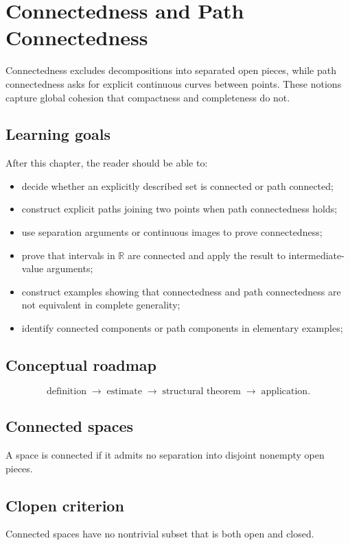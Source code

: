 \chapter{Connectedness and Path Connectedness}
\label{ch:ii07}

Connectedness excludes decompositions into separated open pieces, while path connectedness asks for explicit continuous curves between points. These notions capture global cohesion that compactness and completeness do not.

\section*{Learning goals}
After this chapter, the reader should be able to:
\begin{itemize}
\item decide whether an explicitly described set is connected or path connected;
\item construct explicit paths joining two points when path connectedness holds;
\item use separation arguments or continuous images to prove connectedness;
\item prove that intervals in \(\mathbb R\) are connected and apply the result to intermediate-value arguments;
\item construct examples showing that connectedness and path connectedness are not equivalent in complete generality;
\item identify connected components or path components in elementary examples;
\end{itemize}
\section*{Conceptual roadmap}
\[
\boxed{\text{definition}\;\longrightarrow\;\text{estimate}\;\longrightarrow\;\text{structural theorem}\;\longrightarrow\;\text{application}.}
\]

\section{Connected spaces}
A space is connected if it admits no separation into disjoint nonempty open pieces.

\section{Clopen criterion}
Connected spaces have no nontrivial subset that is both open and closed.

